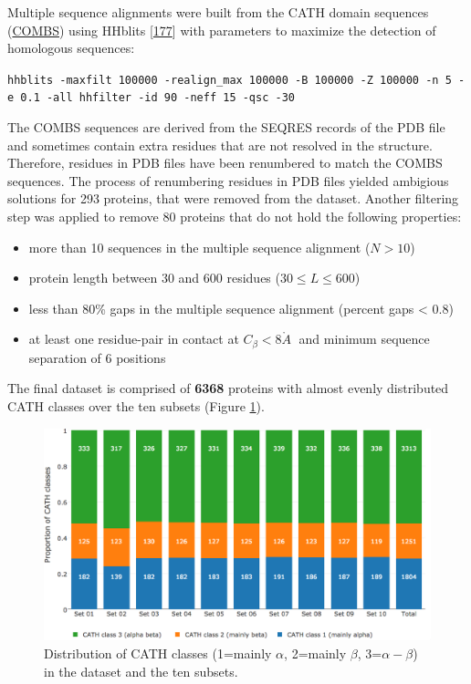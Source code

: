 \documentclass[11pt,a4paper,twoside]{book}
\providecommand{\tightlist}{%
  \setlength{\itemsep}{0pt}\setlength{\parskip}{0pt}}
\newcommand{\angstrom}{\mathring{A} \;}
\theoremstyle{definition}
\theoremstyle{definition}
\theoremstyle{remark}
\begin{document}
Multiple sequence alignments were built from the CATH domain sequences
(\href{http://www.cathdb.info/version/current/domain/3cdjA03/sequence}{COMBS})
using HHblits {[}\protect\hyperlink{ref-Remmert2012}{177}{]} with
parameters to maximize the detection of homologous sequences:

\texttt{hhblits\ -maxfilt\ 100000\ -realign\_max\ 100000\ -B\ 100000\ -Z\ 100000\ -n\ 5\ -e\ 0.1\ -all\ hhfilter\ -id\ 90\ -neff\ 15\ -qsc\ -30}

The COMBS sequences are derived from the SEQRES records of the PDB file
and sometimes contain extra residues that are not resolved in the
structure. Therefore, residues in PDB files have been renumbered to
match the COMBS sequences. The process of renumbering residues in PDB
files yielded ambigious solutions for 293 proteins, that were removed
from the dataset. Another filtering step was applied to remove 80
proteins that do not hold the following properties:

\begin{itemize}
\tightlist
\item
  more than 10 sequences in the multiple sequence alignment (\(N>10\))
\item
  protein length between 30 and 600 residues (\(30 \leq L \leq 600\))
\item
  less than 80\% gaps in the multiple sequence alignment (percent gaps
  \textless{} 0.8)
\item
  at least one residue-pair in contact at \(C_\beta < 8\angstrom\) and
  minimum sequence separation of 6 positions
\end{itemize}

The final dataset is comprised of \textbf{6368} proteins with almost
evenly distributed CATH classes over the ten subsets (Figure
\ref{fig:dataset-cath-topologies}).





\begin{figure}
\includegraphics[width=1\linewidth]{img/dataset_statistics/cath_topologies_stacked_reative_notitle} \caption{Distribution of CATH classes
(1=mainly \(\alpha\), 2=mainly \(\beta\), 3=\(\alpha-\beta\)) in the
dataset and the ten subsets. }\label{fig:dataset-cath-topologies}
\end{figure}
\end{document}
